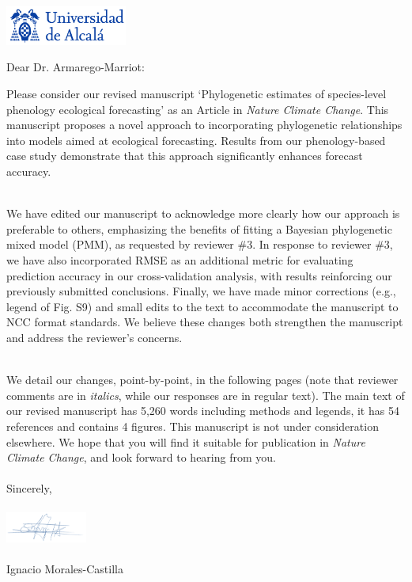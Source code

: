 \documentclass[11pt,a4paper]{letter}
\begin{document}
\begin{letter}{}
\includegraphics[width=0.3\textwidth]{logo_uah.png}

\opening{Dear Dr. Armarego-Marriot:} %

\noindent Please consider our revised manuscript `Phylogenetic estimates of species-level phenology ecological forecasting' as an Article in \emph{Nature Climate Change}. This manuscript proposes a novel approach to incorporating phylogenetic relationships into models aimed at ecological forecasting. Results from our phenology-based case study demonstrate that this approach significantly enhances forecast accuracy.


\vspace{1.5ex}\\
\noindent We have edited our manuscript to acknowledge more clearly how our approach is preferable to others, emphasizing the benefits of fitting a Bayesian phylogenetic mixed model (PMM), as requested by reviewer \#3. In response to reviewer \#3, we have also incorporated RMSE as an additional metric for evaluating prediction accuracy in our cross-validation analysis, with results reinforcing our previously submitted conclusions. Finally, we have made minor corrections (e.g., legend of Fig. S9) and small edits to the text to accommodate the manuscript to NCC format standards. We believe these changes both strengthen the manuscript and address the reviewer's concerns. 


\vspace{1.5ex}\\
\noindent We detail our changes, point-by-point, in the following pages (note that reviewer comments are in \emph{italics}, while our responses are in regular text). The main text of our revised manuscript has 5,260 words including methods and legends, it has 54 references and contains 4 figures. This manuscript is not under consideration elsewhere.  We hope that you will find it suitable for publication in \emph{Nature Climate Change}, and look forward to hearing from you.
\vspace{2.5ex}\\



\vspace{1.5ex}\\
\noindent Sincerely,\\
\vspace{1.5ex}\\
 \includegraphics[width=0.2\textwidth]{Signature_IMC.png} \\
 \vspace{1.5ex}\\
\noindent Ignacio Morales-Castilla



\end{letter}
\end{document}

